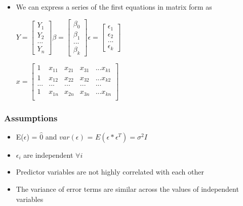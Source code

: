 \documentclass{beamer}
\begin{document}
\begin{frame}
\begin{itemize}
	\item We can express a series of the first equations in matrix form as
	\begin{center}$
		Y = \begin{bmatrix}
		Y_1 \\
		Y_2 \\
		... \\
		Y_n
		\end{bmatrix} \beta = \begin{bmatrix}
		\beta_0 \\
		\beta_1 \\
		... \\
		\beta_k
		\end{bmatrix} \epsilon = \begin{bmatrix}
		\epsilon_1 \\
		\epsilon_2 \\
		... \\
		\epsilon_k
		\end{bmatrix}$ 
		\end{center}
\begin{center}$
	x = \begin{bmatrix}
	1 & x_{11} & x_{21} & x_{31} & ... x_{k1} \\
	1 & x_{12} & x_{22} & x_{32} & ... x_{k2} \\
	... & ... & ... & ... & ... \\
	1 & x_{1n} & x_{2n} & x_{3n} & ... x_{kn} \\
	\end{bmatrix}
	$\end{center}
\end{itemize}
\end{frame}
\begin{frame}
\frametitle{Assumptions}
\begin{itemize}
\item E($\epsilon$) = $\hat{0}$ and $var(\epsilon)$ = $E(\epsilon * \epsilon^T) = \sigma^2 I$ \\
\item $\epsilon_i$ are independent $\forall i$ \\
\item Predictor variables are not highly correlated with each other 
\item The variance of error terms are similar across the values of independent variables
\end{itemize}
\end{frame}
\end{document}
